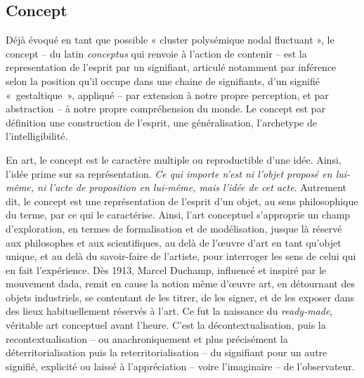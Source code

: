 \subsection*{Concept} 
\label{concept}

Déjà évoqué en tant que possible « cluster polysémique nodal fluctuant », le concept -- du latin \textit{conceptus} qui renvoie à l'action de contenir -- est la representation de l'esprit par un signifiant, articulé notamment par inférence selon la position qu’il occupe dans une chaine de signifiants, d'un signifié \hbox{« gestaltique »}, appliqué -- par extension à notre propre perception, et par abstraction -- à notre propre compréhension du monde. Le concept est par définition une construction de l’esprit, une généralisation, l’archetype de l’intelligibilité.


\bigskip 

En art, le concept est le caractère multiple ou reproductible d'une idée. Ainsi, l'idée prime sur sa représentation. \textit{Ce qui importe n’est ni l’objet proposé en lui-même, ni l’acte de proposition en lui-même, mais l’idée de cet acte}. Autrement dit, le concept est une représentation de l’esprit d’un objet, au sens philosophique du terme, par ce qui le caractérise.
Ainsi, l'art conceptuel s'approprie un champ d'exploration, en termes de formalisation et de modélisation, jusque là réservé aux philosophes et aux scientifiques, au delà de l'œuvre d'art en tant qu'objet unique, et au delà du savoir-faire de l'artiste, pour interroger les sens de celui qui en fait l'expérience.
Dès 1913, Marcel Duchamp, influencé et inspiré par le mouvement dada, remit en cause la notion même d'œuvre art, en détournant des objets industriels, se contentant de les titrer, de les signer, et de les exposer dans des lieux habituellement réservés à l'art. Ce fut la naissance du \textit{ready-made}, véritable art conceptuel avant l'heure. C'est la décontextualisation, puis la recontextualisation -- ou anachroniquement et plus précisément la déterritorialisation puis la reterritorialisation -- du signifiant pour un autre signifié, explicité ou laissé à l'appréciation -- voire l'imaginaire -- de l'observateur. 

